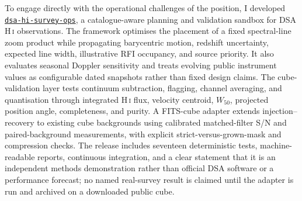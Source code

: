 To engage directly with the operational challenges of the position, I developed
\href{https://github.com/pkd-45/dsa-hi-survey-ops}{\texttt{dsa-hi-survey-ops}},
a catalogue-aware planning and validation sandbox for DSA H\,\textsc{i}
observations. The framework optimises the placement of a fixed spectral-line
zoom product while propagating barycentric motion, redshift uncertainty,
expected line width, illustrative RFI occupancy, and source priority. It also
evaluates seasonal Doppler sensitivity and treats evolving public instrument
values as configurable dated snapshots rather than fixed design claims. The
cube-validation layer tests continuum subtraction, flagging, channel averaging,
and quantisation through integrated H\,\textsc{i} flux, velocity centroid,
$W_{50}$, projected position angle, completeness, and purity. A FITS-cube
adapter extends injection--recovery to existing cube backgrounds using
calibrated matched-filter S/N and paired-background measurements, with explicit
strict-versus-grown-mask and compression checks. The release includes seventeen
deterministic tests, machine-readable reports, continuous integration, and a
clear statement that it is an independent methods demonstration rather than
official DSA software or a performance forecast; no named real-survey result is
claimed until the adapter is run and archived on a downloaded public cube.
